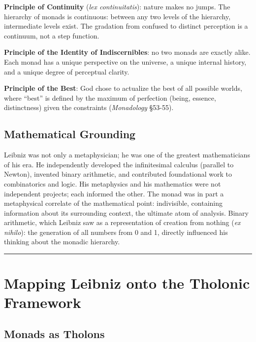 \documentclass[12pt]{article}
\begin{document}
\textbf{Principle of Continuity} (\emph{lex continuitatis}): nature
makes no jumps. The hierarchy of monads is continuous: between any two
levels of the hierarchy, intermediate levels exist. The gradation from
confused to distinct perception is a continuum, not a step function.

\textbf{Principle of the Identity of Indiscernibles}: no two monads are
exactly alike. Each monad has a unique perspective on the universe, a
unique internal history, and a unique degree of perceptual clarity.

\textbf{Principle of the Best}: God chose to actualize the best of all
possible worlds, where ``best'' is defined by the maximum of perfection
(being, essence, distinctness) given the constraints (\emph{Monadology}
§53-55).

\subsection{Mathematical Grounding}\label{mathematical-grounding}

Leibniz was not only a metaphysician; he was one of the greatest
mathematicians of his era. He independently developed the infinitesimal
calculus (parallel to Newton), invented binary arithmetic, and
contributed foundational work to combinatorics and logic. His
metaphysics and his mathematics were not independent projects; each
informed the other. The monad was in part a metaphysical correlate of
the mathematical point: indivisible, containing information about its
surrounding context, the ultimate atom of analysis. Binary arithmetic,
which Leibniz saw as a representation of creation from nothing (\emph{ex
nihilo}): the generation of all numbers from 0 and 1, directly
influenced his thinking about the monadic hierarchy.

\begin{center}\rule{0.5\linewidth}{0.5pt}\end{center}

\section{Mapping Leibniz onto the Tholonic Framework}\label{mapping-leibniz-onto-the-tholonic-framework}

\subsection{Monads as Tholons}\label{monads-as-tholons}
\end{document}
